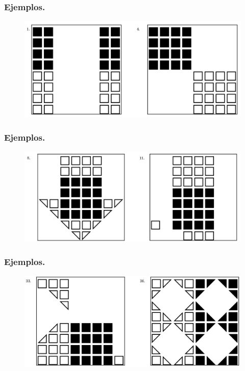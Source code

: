 \documentclass{beamer}
\begin{document}
\begin{frame}[t]
	\frametitle{Ejemplos.}
	\begin{figure}[hbtp!]\begin{overprint}
		\centering
		\includegraphics[width= \linewidth, page = 1]{IMAGENES/2_PROB/2/1}
	\end{overprint}
\end{figure}
\end{frame}

\begin{frame}[t]
	\frametitle{Ejemplos.}
	\begin{figure}[hbtp!]\begin{overprint}
		\centering
		\includegraphics[width= \linewidth, page = 1]{IMAGENES/2_PROB/2/2}
	\end{overprint}
\end{figure}
\end{frame}

\begin{frame}[t]
	\frametitle{Ejemplos.}
	\begin{figure}[hbtp!]\begin{overprint}
		\centering
		\includegraphics[width= \linewidth, page = 1]{IMAGENES/2_PROB/2/3}
	\end{overprint}
\end{figure}
\end{frame}
\end{document}
